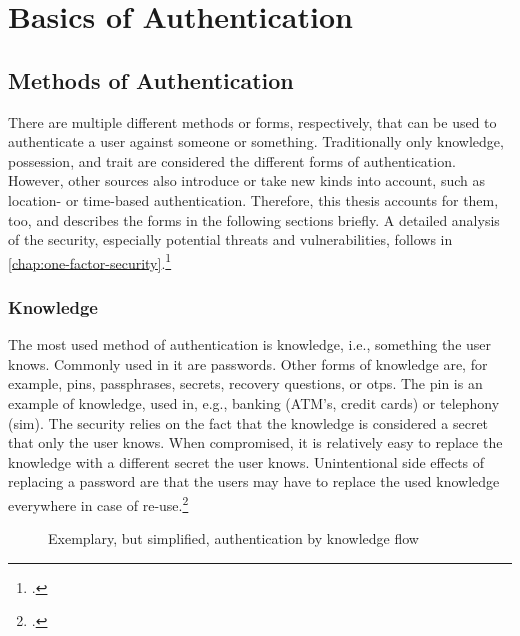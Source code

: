 \chapter{Basics of Authentication}
\label{chapter:basics}

\section{Methods of Authentication}
There are multiple different methods or forms, respectively, that can be used to authenticate a user against someone or something. Traditionally only knowledge, possession, and trait are considered the different forms of authentication. However, other sources also introduce or take new kinds into account, such as location- or time-based authentication. Therefore, this thesis accounts for them, too, and describes the forms in the following sections briefly. A detailed analysis of the security, especially potential threats and vulnerabilities, follows in \autoref{chap:one-factor-security}.\footcites[See][299]{10.2307/27845364}[See][140]{brotherston2017defensive}[See][47]{anderson2008security}[See][]{6296127}[See][191]{dasgupta2017multi}

\subsection{Knowledge}

The most used method of authentication is knowledge, i.e., \frqq something the user knows\flqq{}. Commonly used in \gls{it} are passwords. Other forms of knowledge are, for example, \glspl{pin}, passphrases, secrets, recovery questions, or \glspl{otp}. The \gls{pin} is an example of knowledge, used in, e.g., banking (ATM's, credit cards) or telephony (\gls{sim}). The security relies on the fact that the knowledge is considered a secret that only the user knows. When compromised, it is relatively easy to replace the knowledge with a different secret the user knows. Unintentional side effects of replacing a password are that the users may have to replace the used knowledge everywhere in case of re-use.\footcite[See][467]{eckert-it-sec-9}

\newpage

\begin{figure}[hbt]
	\centering
	
	\caption[Exemplary, but simplified, authentication by knowledge flow]{Exemplary, but simplified, authentication by knowledge flow\footnotemark}
	\label{fig:knowledge_auth_flow}
\end{figure}


